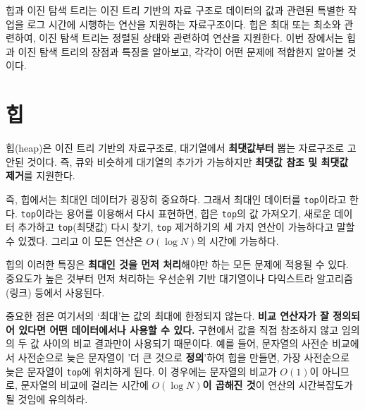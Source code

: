 힙과 이진 탐색 트리는 이진 트리 기반의 자료 구조로 데이터의 값과 관련된 특별한 작업을 로그 시간에 시행하는 연산을 지원하는 자료구조이다. 힙은 최대 또는 최소와 관련하여, 이진 탐색 트리는 정렬된 상태와 관련하여 연산을 지원한다. 이번 장에서는 힙과 이진 탐색 트리의 장점과 특징을 알아보고, 각각이 어떤 문제에 적합한지 알아볼 것이다.

\section{힙}
힙(heap)은 이진 트리 기반의 자료구조로, 대기열에서 \textbf{최댓값부터} 뽑는 자료구조로 고안된 것이다. 즉, 큐와 비슷하게 대기열의 추가가 가능하지만 \textbf{최댓값 참조 및 최댓값 제거}를 지원한다.

\begin{figure}[htbp]
    \centering
\end{figure}

즉, 힙에서는 최대인 데이터가 굉장히 중요하다. 그래서 최대인 데이터를 \texttt{top}이라고 한다. \texttt{top}이라는 용어를 이용해서 다시 표현하면, 힙은 \texttt{top}의 값 가져오기, 새로운 데이터 추가하고 \texttt{top}(최댓값) 다시 찾기, \texttt{top} 제거하기의 세 가지 연산이 가능하다고 말할 수 있겠다. 그리고 이 모든 연산은 $O(\log N)$의 시간에 가능하다.

힙의 이러한 특징은 \textbf{최대인 것을 먼저 처리}해야만 하는 모든 문제에 적용될 수 있다. 중요도가 높은 것부터 먼저 처리하는 우선순위 기반 대기열이나 다익스트라 알고리즘(링크) 등에서 사용된다. 

중요한 점은 여기서의 `최대'는 값의 최대에 한정되지 않는다. \textbf{비교 연산자가 잘 정의되어 있다면 어떤 데이터에서나 사용할 수 있다.} 구현에서 값을 직접 참조하지 않고 임의의 두 값 사이의 비교 결과만이 사용되기 때문이다. 예를 들어, 문자열의 사전순 비교에서 사전순으로 늦은 문자열이 '더 큰 것으로 \textbf{정의}'하여 힙을 만들면, 가장 사전순으로 늦은 문자열이 \texttt{top}에 위치하게 된다. 이 경우에는 문자열의 비교가 $O(1)$이 아니므로, 문자열의 비교에 걸리는 시간에 \textbf{$O(\log N)$이 곱해진 것}이 연산의 시간복잡도가 될 것임에 유의하라.

